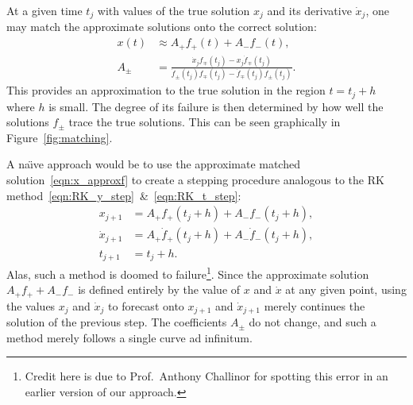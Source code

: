 At a given time \(t_j\) with values of the true solution \(x_j\) and its derivative \(\dot{x}_j\), one may match the approximate solutions onto the correct solution:
\begin{align}
    x(t) &\approx  A_+ f_+(t) + A_- f_-(t) ,
    \label{eqn:x_approxf}\\
    A_\pm &= \frac{\dot{x}_j f_\mp(t_j) - x_j \dot{f}_\mp(t_j) }{\dot{f}_\pm(t_j) f_\mp(t_j) - \dot{f}_\mp(t_j) f_\pm(t_j)}.
    \label{eqn:Apm}
\end{align}
This provides an approximation to the true solution in the region \(t=t_j + h\) where \(h\) is small. The degree of its failure is then determined by how well the solutions \(f_\pm\) trace the true solutions. This can be seen graphically in Figure~\ref{fig:matching}.

A na\"{\i}ve approach would be to use the approximate matched solution~\eqref{eqn:x_approxf} to create a stepping procedure analogous to the RK method~\eqref{eqn:RK_y_step}~\&~\eqref{eqn:RK_t_step}:
\begin{align}
  x_{j+1} &= A_+ f_+(t_j + h) + A_- f_-(t_j + h) ,\label{eqn:x_step_wrong}\\
  \dot{x}_{j+1} &= A_+ \dot{f}_+(t_j + h) + A_- \dot{f}_-(t_j + h) ,\label{eqn:x_dot_step_wrong}\\
  t_{j+1} &= t_j+h\label{eqn:t_step_wrong}.
\end{align}
Alas, such a method is doomed to failure\footnote{Credit here is due to Prof.\ Anthony Challinor for spotting this error in an earlier version of our approach.}. Since the approximate solution \(A_+ f_+ + A_- f_-\) is defined entirely by the value of \(x\) and \(\dot{x}\) at any given point, using the values \(x_j\) and \(\dot{x}_{j}\) to forecast onto \(x_{j+1}\) and \(\dot{x}_{j+1}\) merely continues the solution of the previous step. The coefficients \(A_\pm\) do not change, and such a method merely follows a single curve ad infinitum.

